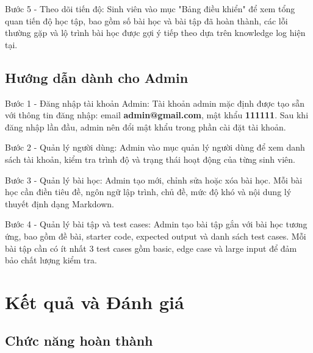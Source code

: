 \documentclass[../main.tex]{subfiles}
\begin{document}
Bước 5 - Theo dõi tiến độ: Sinh viên vào mục "Bảng điều khiển" để xem tổng quan tiến độ học tập, bao gồm số bài học và bài tập đã hoàn thành, các lỗi thường gặp và lộ trình bài học được gợi ý tiếp theo dựa trên knowledge log hiện tại.

\subsection{Hướng dẫn dành cho Admin}

Bước 1 - Đăng nhập tài khoản Admin: Tài khoản admin mặc định được tạo sẵn với thông tin đăng nhập: email \textbf{admin@gmail.com}, mật khẩu \textbf{111111}. Sau khi đăng nhập lần đầu, admin nên đổi mật khẩu trong phần cài đặt tài khoản.

Bước 2 - Quản lý người dùng: Admin vào mục quản lý người dùng để xem danh sách tài khoản, kiểm tra trình độ và trạng thái hoạt động của từng sinh viên.

Bước 3 - Quản lý bài học: Admin tạo mới, chỉnh sửa hoặc xóa bài học. Mỗi bài học cần điền tiêu đề, ngôn ngữ lập trình, chủ đề, mức độ khó và nội dung lý thuyết định dạng Markdown.

Bước 4 - Quản lý bài tập và test cases: Admin tạo bài tập gắn với bài học tương ứng, bao gồm đề bài, starter code, expected output và danh sách test cases. Mỗi bài tập cần có ít nhất 3 test cases gồm basic, edge case và large input để đảm bảo chất lượng kiểm tra.

\section{Kết quả và Đánh giá}

\subsection{Chức năng hoàn thành}
\end{document}

